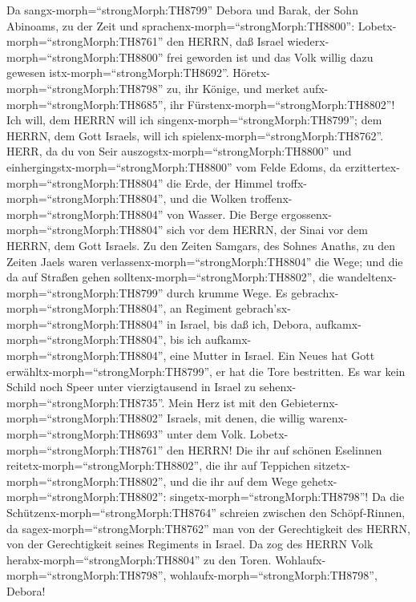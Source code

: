  Da sangx-morph=``strongMorph:TH8799'' Debora und Barak, der
Sohn Abinoams, zu der Zeit und sprachenx-morph=``strongMorph:TH8800'':
 Lobetx-morph=``strongMorph:TH8761'' den HERRN, daß Israel
wiederx-morph=``strongMorph:TH8800'' frei geworden ist und das Volk
willig dazu gewesen istx-morph=``strongMorph:TH8692''. 
Höretx-morph=``strongMorph:TH8798'' zu, ihr Könige, und merket
aufx-morph=``strongMorph:TH8685'', ihr
Fürstenx-morph=``strongMorph:TH8802''! Ich will, dem HERRN will ich
singenx-morph=``strongMorph:TH8799''; dem HERRN, dem Gott Israels, will
ich spielenx-morph=``strongMorph:TH8762''.  HERR, da du von
Seir auszogstx-morph=``strongMorph:TH8800'' und
einhergingstx-morph=``strongMorph:TH8800'' vom Felde Edoms, da
erzittertex-morph=``strongMorph:TH8804'' die Erde, der Himmel
troffx-morph=``strongMorph:TH8804'', und die Wolken
troffenx-morph=``strongMorph:TH8804'' von Wasser.  Die Berge
ergossenx-morph=``strongMorph:TH8804'' sich vor dem HERRN, der Sinai vor
dem HERRN, dem Gott Israels.  Zu den Zeiten Samgars, des
Sohnes Anaths, zu den Zeiten Jaels waren
verlassenx-morph=``strongMorph:TH8804'' die Wege; und die da auf Straßen
gehen solltenx-morph=``strongMorph:TH8802'', die
wandeltenx-morph=``strongMorph:TH8799'' durch krumme Wege. 
Es gebrachx-morph=``strongMorph:TH8804'', an Regiment
gebrach'sx-morph=``strongMorph:TH8804'' in Israel, bis daß ich, Debora,
aufkamx-morph=``strongMorph:TH8804'', bis ich
aufkamx-morph=``strongMorph:TH8804'', eine Mutter in Israel.
 Ein Neues hat Gott erwähltx-morph=``strongMorph:TH8799'',
er hat die Tore bestritten. Es war kein Schild noch Speer unter
vierzigtausend in Israel zu sehenx-morph=``strongMorph:TH8735''.
 Mein Herz ist mit den
Gebieternx-morph=``strongMorph:TH8802'' Israels, mit denen, die willig
warenx-morph=``strongMorph:TH8693'' unter dem Volk.
Lobetx-morph=``strongMorph:TH8761'' den HERRN!  Die ihr auf
schönen Eselinnen reitetx-morph=``strongMorph:TH8802'', die ihr auf
Teppichen sitzetx-morph=``strongMorph:TH8802'', und die ihr auf dem Wege
gehetx-morph=``strongMorph:TH8802'':
singetx-morph=``strongMorph:TH8798''!  Da die
Schützenx-morph=``strongMorph:TH8764'' schreien zwischen den
Schöpf-Rinnen, da sagex-morph=``strongMorph:TH8762'' man von der
Gerechtigkeit des HERRN, von der Gerechtigkeit seines Regiments in
Israel. Da zog des HERRN Volk herabx-morph=``strongMorph:TH8804'' zu den
Toren.  Wohlaufx-morph=``strongMorph:TH8798'',
wohlaufx-morph=``strongMorph:TH8798'', Debora!
